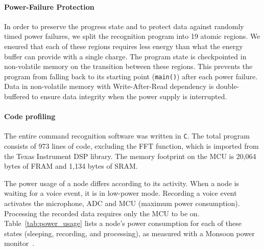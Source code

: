 \paragraph{Power-Failure Protection}
In order to preserve the progress state and to protect \cim data against randomly timed power failures, we split the recognition program into 19 atomic regions. 
We ensured that each of these regions requires less energy than what the energy buffer can provide with a single charge. 
The program state is checkpointed in non-volatile memory on the transition between these regions. This prevents the program from falling back to its starting point (\texttt{main()}) after each power failure. 
Data in non-volatile memory with Write-After-Read dependency is double-buffered to ensure data integrity when the power supply is interrupted.
%
\paragraph{Code profiling}
The entire command recognition software was written in {\tt C}. The total program consists of 973 lines of code, excluding the FFT function, which is imported from the Texas Instrument DSP library.
The memory footprint on the MCU is 20,064 bytes of FRAM and 1,134 bytes of SRAM.

The power usage of a node differs according to its activity. When a node is waiting for a voice event, it is in low-power mode. Recording a voice event activates the microphone, ADC and MCU (maximum power consumption). Processing the recorded data requires only the MCU to be on. Table~\ref{tab:power_usage} lists a node's power consumption for each of these states (sleeping, recording, and processing), as measured with a Monsoon power monitor~\cite{monsoon}. 
%
%
